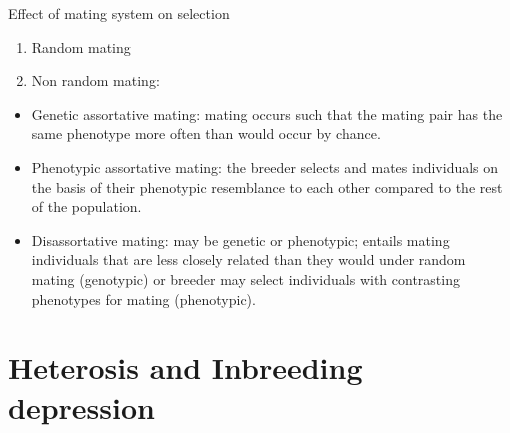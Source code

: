 \documentclass[11pt,dvipsnames,ignorenonframetext,aspectratio=169]{beamer}
\providecommand{\tightlist}{%
  \setlength{\itemsep}{0pt}\setlength{\parskip}{0pt}}
\begin{document}
\begin{frame}{Effect of mating system on selection}
\protect\hypertarget{effect-of-mating-system-on-selection}{}

\begin{enumerate}
\tightlist
\item
  Random mating
\item
  Non random mating:
\end{enumerate}

\begin{itemize}
\tightlist
\item
  Genetic assortative mating: mating occurs such that the mating pair
  has the same phenotype more often than would occur by chance.
\item
  Phenotypic assortative mating: the breeder selects and mates
  individuals on the basis of their phenotypic resemblance to each other
  compared to the rest of the population.
\item
  Disassortative mating: may be genetic or phenotypic; entails mating
  individuals that are less closely related than they would under random
  mating (genotypic) or breeder may select individuals with contrasting
  phenotypes for mating (phenotypic).
\end{itemize}

\end{frame}

\hypertarget{heterosis-and-inbreeding-depression}{%
\section{Heterosis and Inbreeding
depression}\label{heterosis-and-inbreeding-depression}}
\end{document}
